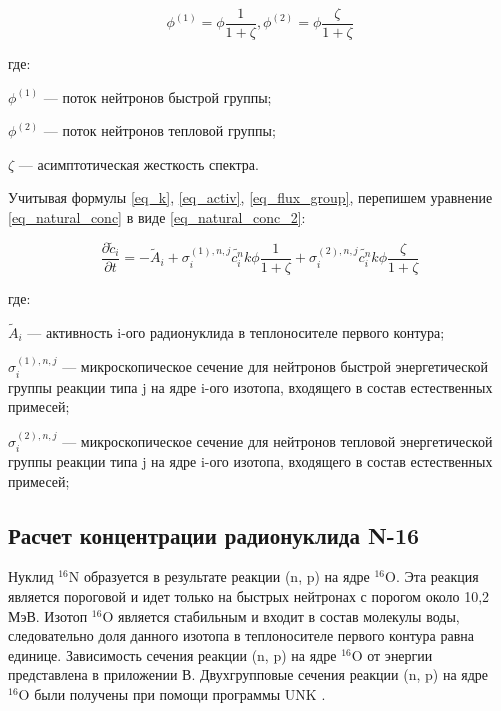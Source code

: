 \begin{equation}
    \label{eq_flux_group}
    \phi^{(1)} = \phi \frac{1}{1 + \zeta}, \phi^{(2)} = \phi \frac{\zeta}{1 + \zeta}
\end{equation}

где:
\begin{description}
    \item $\phi^{(1)}$ --- поток нейтронов быстрой группы;
    \item $\phi^{(2)}$ --- поток нейтронов тепловой группы;
    \item $\zeta$ --- асимптотическая жесткость спектра.
\end{description}

Учитывая формулы \ref{eq_k}, \ref{eq_activ}, \ref{eq_flux_group}, перепишем уравнение \ref{eq_natural_conc} в виде 
\ref{eq_natural_conc_2}:

\begin{equation}
    \label{eq_natural_conc_2}
    \frac{\partial \widetilde{c}_{i}}{\partial t} = -\widetilde{A}_{i} + \sigma_{i}^{(1), n,j} \widetilde{c_{i}^{n}}
        k \phi \frac{1}{1 + \zeta} + \sigma_{i}^{(2), n,j} \widetilde{c_{i}^{n}} k \phi \frac{\zeta}{1 + \zeta}
\end{equation}

где:
\begin{description}
    \item $\widetilde{A}_{i}$ --- активность i-ого радионуклида в теплоносителе первого контура;
    \item $\sigma_{i}^{(1), n,j}$ --- микроскопическое сечение для нейтронов быстрой энергетической группы реакции типа 
        j на ядре i-ого изотопа, входящего в состав естественных примесей;
    \item $\sigma_{i}^{(2), n,j}$ --- микроскопическое сечение для нейтронов тепловой энергетической группы реакции типа 
        j на ядре i-ого изотопа, входящего в состав естественных примесей; 
\end{description}

\subsection{Расчет концентрации радионуклида N-16}

Нуклид $^{16}\text{N}$ образуется в результате реакции (n, p) на ядре $^{16}\text{O}$. Эта реакция является 
пороговой и идет только на быстрых нейтронах с порогом около 10,2 МэВ. Изотоп $^{16}\text{O}$ является стабильным и 
входит в состав молекулы воды, следовательно доля данного изотопа в теплоносителе первого контура равна единице. 
Зависимость сечения реакции (n, p) на ядре $^{16}\text{O}$ от энергии представлена в приложении В. Двухгрупповые 
сечения реакции (n, p) на ядре $^{16}\text{O}$ были получены при помощи программы UNK \cite{unk}.

